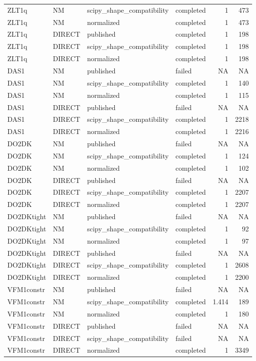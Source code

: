 \begin{tabular}{llllrr}
ZLT1q & NM & scipy\_shape\_compatibility & completed & 1 & 473 \\
ZLT1q & NM & normalized & completed & 1 & 473 \\
ZLT1q & DIRECT & published & completed & 1 & 198 \\
ZLT1q & DIRECT & scipy\_shape\_compatibility & completed & 1 & 198 \\
ZLT1q & DIRECT & normalized & completed & 1 & 198 \\
DAS1 & NM & published & failed & NA & NA \\
DAS1 & NM & scipy\_shape\_compatibility & completed & 1 & 140 \\
DAS1 & NM & normalized & completed & 1 & 115 \\
DAS1 & DIRECT & published & failed & NA & NA \\
DAS1 & DIRECT & scipy\_shape\_compatibility & completed & 1 & 2218 \\
DAS1 & DIRECT & normalized & completed & 1 & 2216 \\
DO2DK & NM & published & failed & NA & NA \\
DO2DK & NM & scipy\_shape\_compatibility & completed & 1 & 124 \\
DO2DK & NM & normalized & completed & 1 & 102 \\
DO2DK & DIRECT & published & failed & NA & NA \\
DO2DK & DIRECT & scipy\_shape\_compatibility & completed & 1 & 2207 \\
DO2DK & DIRECT & normalized & completed & 1 & 2207 \\
DO2DKtight & NM & published & failed & NA & NA \\
DO2DKtight & NM & scipy\_shape\_compatibility & completed & 1 & 92 \\
DO2DKtight & NM & normalized & completed & 1 & 97 \\
DO2DKtight & DIRECT & published & failed & NA & NA \\
DO2DKtight & DIRECT & scipy\_shape\_compatibility & completed & 1 & 2608 \\
DO2DKtight & DIRECT & normalized & completed & 1 & 2200 \\
VFM1constr & NM & published & failed & NA & NA \\
VFM1constr & NM & scipy\_shape\_compatibility & completed & 1.414 & 189 \\
VFM1constr & NM & normalized & completed & 1 & 180 \\
VFM1constr & DIRECT & published & failed & NA & NA \\
VFM1constr & DIRECT & scipy\_shape\_compatibility & failed & NA & NA \\
VFM1constr & DIRECT & normalized & completed & 1 & 3349 \\
\bottomrule
\end{tabular}
